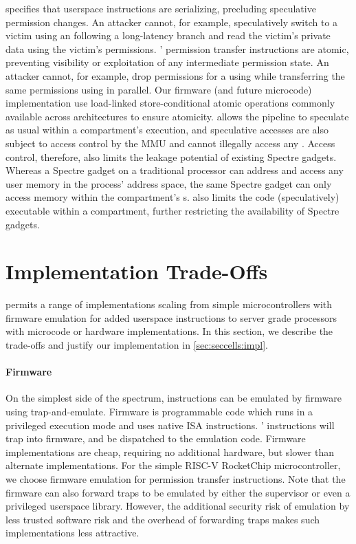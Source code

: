 \seccells specifies that userspace instructions are serializing, 
precluding speculative permission changes.
An attacker cannot, for example, speculatively switch to a victim
\secdiv using an \sdswitch following a long-latency branch and read 
the victim's private data using the victim's permissions.
\seccells' permission transfer instructions are atomic, preventing visibility 
or exploitation of any intermediate permission state.
An attacker \secdiv cannot, for example, drop permissions for a \cell
using \scprot while transferring the same permissions using \sctfer in parallel.
Our firmware (and future microcode) implementation use load-linked 
store-conditional atomic operations commonly available across architectures
to ensure atomicity.
\seccells allows the pipeline to speculate as usual within a compartment's 
execution, and speculative accesses are also subject to access control 
by the MMU and cannot illegally access any \cell.
Access control, therefore, also limits the leakage potential of existing
Spectre gadgets.
Whereas a Spectre gadget on a traditional processor can address and
access any user memory in the process' address space, the same Spectre
gadget can only access memory within the compartment's \cell{}s.
\seccells also limits the code (speculatively) executable within a compartment,
further restricting the availability of Spectre gadgets.

\section{\seccells Implementation Trade-Offs}
\label{app:impl_options}

\seccells permits a range of implementations scaling from simple 
microcontrollers with firmware emulation for added userspace
instructions to server grade processors with microcode or hardware 
implementations. In this section, we describe the trade-offs and 
justify our implementation in \autoref{sec:seccells:impl}.

\paragraph{Firmware}
On the simplest side of the spectrum, instructions can be emulated
by firmware using trap-and-emulate.
Firmware is programmable code which runs in a privileged execution mode 
and uses native ISA instructions.
\seccells' instructions will trap into firmware, and be dispatched to 
the emulation code.
Firmware implementations are cheap, requiring no additional hardware, but 
slower than alternate implementations.
For the simple RISC-V RocketChip microcontroller, we choose 
firmware emulation for permission transfer instructions.
Note that the firmware can also forward traps to be emulated by
either the supervisor or even a privileged userspace library.
However, the additional security risk of emulation by less trusted
software risk and the overhead of forwarding traps makes such
implementations less attractive.

